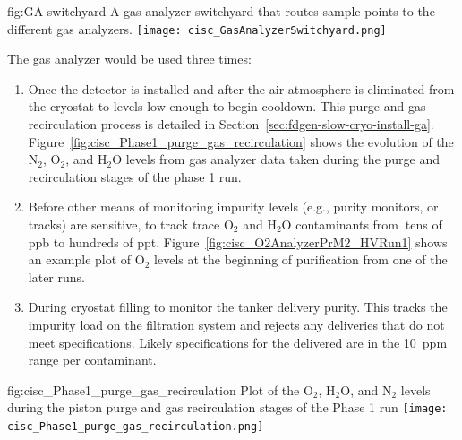 \begin{dunefigure}{fig:GA-switchyard}
  {A gas analyzer switchyard that routes sample points to the different gas analyzers.}
  \texttt{[image: cisc\_GasAnalyzerSwitchyard.png]}
\end{dunefigure}

The gas analyzer would be used three times:


\begin{enumerate}
\item Once the detector is installed and after the air atmosphere is eliminated from the cryostat to levels low enough to begin cooldown. This purge and gas recirculation process is detailed in Section~\ref{sec:fdgen-slow-cryo-install-ga}. Figure~\ref{fig:cisc_Phase1_purge_gas_recirculation} shows the evolution of the $\text{N}_2$, $\text{O}_2$, and $\text{H}_2\text{O}$ levels from gas analyzer data taken during the purge and recirculation stages of the   %
phase 1 run.

\item Before other means of monitoring impurity levels (e.g., purity monitors, or  tracks) are sensitive, to track trace $\text{O}_2$ and $\text{H}_2\text{O}$ contaminants from $\>$tens of ppb to hundreds of ppt.  Figure~\ref{fig:cisc_O2AnalyzerPrM2_HVRun1} shows an example plot of $\text{O}_2$ levels at the beginning of \lar purification from one of the later   runs.

\item During cryostat filling to monitor the tanker \lar delivery purity. This tracks the impurity load on the filtration system and rejects any deliveries that do not meet specifications. Likely specifications for the delivered \lar are in the \SI{10}{ppm} range per contaminant.

\end{enumerate}

\begin{dunefigure}{fig:cisc_Phase1_purge_gas_recirculation}
  {Plot of the $\text{O}_2$, $\text{H}_2\text{O}$, and $\text{N}_2$ levels during the piston purge and gas recirculation stages of the  Phase 1 run}
  \texttt{[image: cisc\_Phase1\_purge\_gas\_recirculation.png]}
\end{dunefigure}

